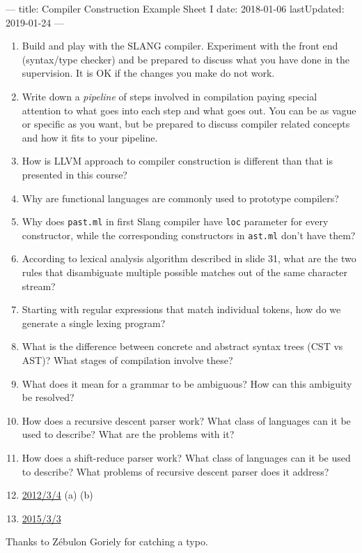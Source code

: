 ---
title: Compiler Construction Example Sheet I
date: 2018-01-06
lastUpdated: 2019-01-24
---



\begin{enumerate}
  \item Build and play with the SLANG compiler. Experiment with the front end
    (syntax/type checker) and be prepared to discuss what you have done in the
    supervision. It is OK if the changes you make do not work.

  \item Write down a \emph{pipeline} of steps involved in compilation paying
    special attention to what goes into each step and what goes out. You can be
    as vague or specific as you want, but be prepared to discuss compiler
    related concepts and how it fits to your pipeline.

  \item How is \textsc{LLVM} approach to compiler construction is different
    than that is presented in this course?

  \item Why are functional languages are commonly used to prototype compilers?

  \item Why does \texttt{past.ml} in first Slang compiler have \texttt{loc}
    parameter for every constructor, while the corresponding constructors in
    \texttt{ast.ml} don't have them?

  \item According to lexical analysis algorithm described in slide 31, what are
    the two rules that disambiguate multiple possible matches out of the same
    character stream?

  \item Starting with regular expressions that match individual tokens, how do
    we generate a single lexing program?

  \item What is the difference between concrete and abstract syntax trees (CST
    vs AST)? What stages of compilation involve these?

  \item What does it mean for a grammar to be ambiguous? How can this ambiguity
    be resolved?

  \item How does a recursive descent parser work? What class of languages can it
    be used to describe? What are the problems with it?

  \item How does a shift-reduce parser work? What class of languages can it be
    used to describe? What problems of recursive descent parser does it address?

  \item \href{http://www.cl.cam.ac.uk/teaching/exams/pastpapers/y2012p3q4.pdf}{2012/3/4} (a) (b)

  \item \href{http://www.cl.cam.ac.uk/teaching/exams/pastpapers/y2015p3q3.pdf}{2015/3/3}
\end{enumerate}

Thanks to Zébulon Goriely for catching a typo.


